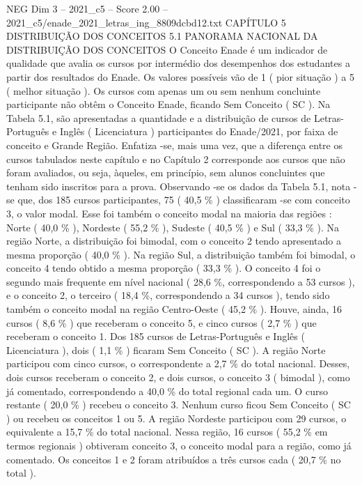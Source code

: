 \begin{textsample}{NEG Dim 3 – 2021\_c5 – Score 2.00 – 2021\_c5/enade\_2021\_letras\_ing\_8809dcbd12.txt}  \label{ex:f3_neg_199}
CAPÍTULO 5 DISTRIBUIÇÃO DOS CONCEITOS 5.1 PANORAMA NACIONAL DA DISTRIBUIÇÃO DOS CONCEITOS O Conceito Enade é um indicador de qualidade que avalia os cursos por intermédio dos desempenhos dos estudantes a partir dos resultados do Enade.
Os valores possíveis vão de 1 ( pior situação ) a 5 ( melhor situação ).
Os cursos com apenas um ou sem nenhum concluinte participante não obtêm o Conceito Enade, ficando Sem Conceito ( SC ).
Na Tabela 5.1, são apresentadas a quantidade e a distribuição de cursos de Letras-Português e Inglês ( Licenciatura ) participantes do Enade/2021, por faixa de conceito e Grande Região.
Enfatiza -se, mais uma vez, que a diferença entre os cursos tabulados neste capítulo e no Capítulo 2 corresponde aos cursos que não foram avaliados, ou seja, àqueles, em princípio, sem alunos concluintes que tenham sido inscritos para a prova.
Observando -se os dados da Tabela 5.1, nota -se que, dos 185 cursos participantes, 75 ( 40,5 \% ) classificaram -se com conceito 3, o valor modal.
Esse foi também o conceito modal na maioria das regiões : Norte ( 40,0 \% ), Nordeste ( 55,2 \% ), Sudeste ( 40,5 \% ) e Sul ( 33,3 \% ).
Na região Norte, a distribuição foi bimodal, com o conceito 2 tendo apresentado a mesma proporção ( 40,0 \% ).
Na região Sul, a distribuição também foi bimodal, o conceito 4 tendo obtido a mesma proporção ( 33,3 \% ).
O conceito 4 foi o segundo mais frequente em nível nacional ( 28,6 \%, correspondendo a 53 cursos ), e o conceito 2, o terceiro ( 18,4 \%, correspondendo a 34 cursos ), tendo sido também o conceito modal na região Centro-Oeste ( 45,2 \% ).
Houve, ainda, 16 cursos ( 8,6 \% ) que receberam o conceito 5, e cinco cursos ( 2,7 \% ) que receberam o conceito 1.
Dos 185 cursos de Letras-Português e Inglês ( Licenciatura ), dois ( 1,1 \% ) ficaram Sem Conceito ( SC ).
A região Norte participou com cinco cursos, o correspondente a 2,7 \% do total nacional.
Desses, dois cursos receberam o conceito 2, e dois cursos, o conceito 3 ( bimodal ), como já comentado, correspondendo a 40,0 \% do total regional cada um.
O curso restante ( 20,0 \% ) recebeu o conceito 3.
Nenhum curso ficou Sem Conceito ( SC ) ou recebeu os conceitos 1 ou 5.
A região Nordeste participou com 29 cursos, o equivalente a 15,7 \% do total nacional.
Nessa região, 16 cursos ( 55,2 \% em termos regionais ) obtiveram conceito 3, o conceito modal para a região, como já comentado.
Os conceitos 1 e 2 foram atribuídos a três cursos cada ( 20,7 \% no total ).

\end{textsample}
